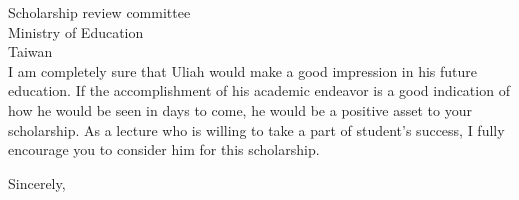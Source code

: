 \documentclass[12pt, a4paper]{simref} %
\begin{document}
\begin{letter}{
	Scholarship review committee\\
	Ministry of Education\\
	Taiwan\\
}
I am completely sure that Uliah would make a good impression in his future education.
If the accomplishment of his academic endeavor is a good indication of how he would be seen in days to come, he would be a positive asset to your scholarship. As a lecture who is willing to take a part of student's success, I fully encourage you to consider him for this scholarship.




\closing{Sincerely,}




\end{letter}
\end{document}
